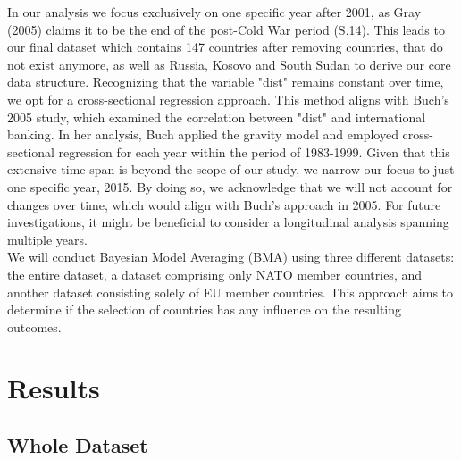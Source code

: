 \documentclass[12pt,a4paper]{article}
\begin{document}
In our analysis we focus exclusively on one specific year after 2001, as Gray (2005) claims it to be the end of the post-Cold War period (S.14). This leads to our final dataset which contains 147 countries after removing countries, that do not exist anymore, as well as Russia, Kosovo and South Sudan to derive our core data structure. Recognizing that the variable "dist" remains constant over time, we opt for a cross-sectional regression approach. This method aligns with Buch's 2005 study, which examined the correlation between "dist" and international banking. In her analysis, Buch applied the gravity model and employed cross-sectional regression for each year within the period of 1983-1999. Given that this extensive time span is beyond the scope of our study, we narrow our focus to just one specific year, 2015. By doing so, we acknowledge that we will not account for changes over time, which would align with Buch's approach in 2005. For future investigations, it might be beneficial to consider a longitudinal analysis spanning multiple years. \\

We will conduct Bayesian Model Averaging (BMA) using three different datasets: the entire dataset, a dataset comprising only NATO member countries, and another dataset consisting solely of EU member countries. This approach aims to determine if the selection of countries has any influence on the resulting outcomes. \\

 
\section{Results}
\subsection{Whole Dataset}
\end{document}
